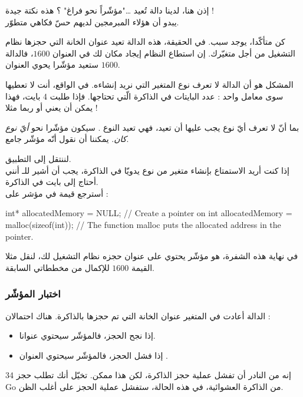 إذن هنا، لدينا دالة تُعيد \dots "مؤشّراً نحو فراغ" ؟ هذه نكتة جيدة !\\
يبدو أن هؤلاء المبرمجين لديهم حسّ فكاهي متطوّر.

كن متأكّدا، يوجد سبب. في الحقيقة، هذه الدالة تعيد عنوان الخانة التي حجزها نظام التشغيل من أجل متغيّرك. إن استطاع النظام إيجاد مكان لك في العنوان
$1600$،
فالدالة ستعيد مؤشّرا يحوي العنوان
$1600$.

المشكل هو أن الدالة
لا تعرف نوع المتغير التي نريد إنشاءه. في الواقع، أنت لا تعطيها سوى معامل واحد : عدد البايتات في الذاكرة الّتي تحتاجها. فإذا طلبت 4 بايت، فهذا يمكن أن يعني
أو ربما
مثلا !

بما أنّ
لا تعرف أيّ نوع يجب عليها أن تعيد، فهي تعيد النوع
.
سيكون مؤشّرا نحو
\textit{أيّ نوع كان}.
يمكننا أن نقول أنّه مؤشّر جامع.

لننتقل إلى التطبيق.\\
إذا كنت أريد الاستمتاع بإنشاء متغير من نوع
يدويّا في الذاكرة، يجب أن أشير للـ
أنني أحتاج إلى
بايت في الذاكرة.\\
أسترجع قيمة
في مؤشر على
 :

\begin{Csource}
int* allocatedMemory = NULL; // Create a pointer on int
allocatedMemory = malloc(sizeof(int)); // The function malloc puts the allocated address in the pointer.
\end{Csource}

في نهاية هذه الشفرة،
هو مؤشّر يحتوي على عنوان حجزه نظام التشغيل لك، لنقل مثلا القيمة
$1600$
للإكمال من مخططاتي السابقة.

\subsubsection{اختبار المؤشّر}
الدالة
أعادت في المتغير
عنوان الخانة التي تم حجزها بالذاكرة. هناك احتمالان :
\begin{itemize}
  \item إذا نجح الحجز، فالمؤشّر سيحتوي عنوانا.
  \item إذا فشل الحجز، فالمؤشّر سيحتوي العنوان
.
\end{itemize}

إنه من النادر أن تفشل عملية حجز الذاكرة، لكن هذا ممكن. تخيّل أنك تطلب حجز
\textenglish{34 Go}
من الذاكرة العشوائية، في هذه الحالة، ستفشل عملية الحجز على أغلب الظن.

